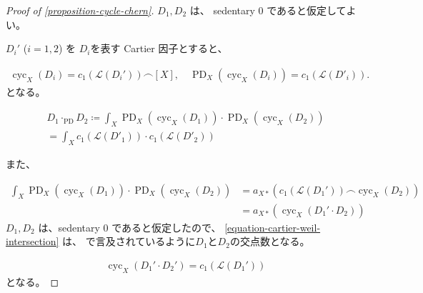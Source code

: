 \documentclass[a4paper,dvipdfmx,reqno,12pt]{amsart}
\theoremstyle{definition}
\newcommand{\deq}{\coloneqq}
\newcommand{\opn}[1]{\operatorname{#1}}
\numberwithin{equation}{section}
\begin{document}
\begin{proof}[{Proof of \cref{proposition-cycle-chern}}]

$D_1,D_2$ は、 sedentary 0 であると仮定してよい。

$D_i'$ ($i=1,2$) を $D_i$を表す Cartier 因子とすると、

\begin{align}
\opn{cyc}_X(D_i)=c_1(\mathcal{L}(D_i'))\frown [X], \quad
\opn{PD}_X(\opn{cyc}_X(D_i))=c_1(\mathcal{L}(D'_i)).
\end{align}
となる。

\begin{align}
D_1\cdot_{\opn{PD}} D_2
\deq \int_X \opn{PD}_X(\opn{cyc}_X(D_1))\cdot \opn{PD}_X(\opn{cyc}_X(D_2))\\
=\int_X c_1(\mathcal{L}(D'_1))\cdot c_1(\mathcal{L}(D'_2))
\end{align}

また、

\begin{align}
\int_X \opn{PD}_X(\opn{cyc}_X(D_1))\cdot 
\opn{PD}_X(\opn{cyc}_X(D_2))& =
a_{X*} (c_1(\mathcal{L}(D_1')) \frown \opn{cyc}_X(D_2)) \\
& =a_{X*}(\opn{cyc}_X(D_1'\cdot D_2)) 
\label{equation-cartier-weil-intersection}
\end{align}
$D_1,D_2$ は、sedentary 0 であると仮定したので、
\cref{equation-cartier-weil-intersection}
は、\cite{shaw2015tropical,demedrano2023chern}
で言及されているように$D_1$と$D_2$の交点数となる。

\begin{align}
\opn{cyc}_X(D_1'\cdot D_2')=c_1(\mathcal{L}(D_1'))
\end{align}
となる。
\end{proof}




\end{document}

